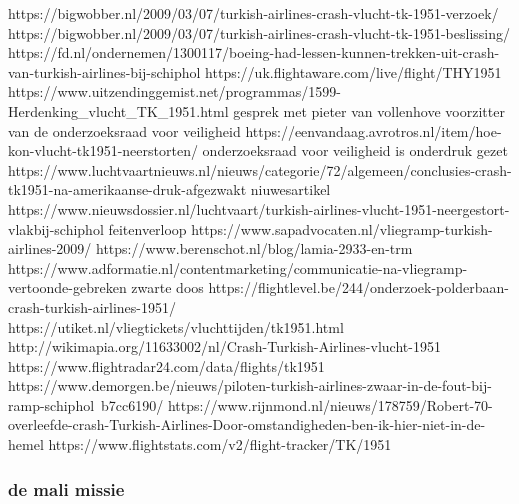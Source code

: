 https://bigwobber.nl/2009/03/07/turkish-airlines-crash-vlucht-tk-1951-verzoek/
https://bigwobber.nl/2009/03/07/turkish-airlines-crash-vlucht-tk-1951-beslissing/
https://fd.nl/ondernemen/1300117/boeing-had-lessen-kunnen-trekken-uit-crash-van-turkish-airlines-bij-schiphol
https://uk.flightaware.com/live/flight/THY1951
https://www.uitzendinggemist.net/programmas/1599-Herdenking_vlucht_TK_1951.html
gesprek met pieter van vollenhove voorzitter van de onderzoeksraad voor veiligheid
https://eenvandaag.avrotros.nl/item/hoe-kon-vlucht-tk1951-neerstorten/
onderzoeksraad voor veiligheid is onderdruk gezet
https://www.luchtvaartnieuws.nl/nieuws/categorie/72/algemeen/conclusies-crash-tk1951-na-amerikaanse-druk-afgezwakt
niuwesartikel
https://www.nieuwsdossier.nl/luchtvaart/turkish-airlines-vlucht-1951-neergestort-vlakbij-schiphol
feitenverloop
https://www.sapadvocaten.nl/vliegramp-turkish-airlines-2009/
https://www.berenschot.nl/blog/lamia-2933-en-trm
https://www.adformatie.nl/contentmarketing/communicatie-na-vliegramp-vertoonde-gebreken
zwarte doos
https://flightlevel.be/244/onderzoek-polderbaan-crash-turkish-airlines-1951/
https://utiket.nl/vliegtickets/vluchttijden/tk1951.html
http://wikimapia.org/11633002/nl/Crash-Turkish-Airlines-vlucht-1951
https://www.flightradar24.com/data/flights/tk1951
https://www.demorgen.be/nieuws/piloten-turkish-airlines-zwaar-in-de-fout-bij-ramp-schiphol~b7cc6190/
https://www.rijnmond.nl/nieuws/178759/Robert-70-overleefde-crash-Turkish-Airlines-Door-omstandigheden-ben-ik-hier-niet-in-de-hemel
https://www.flightstats.com/v2/flight-tracker/TK/1951









\subsubsection{de mali missie}



